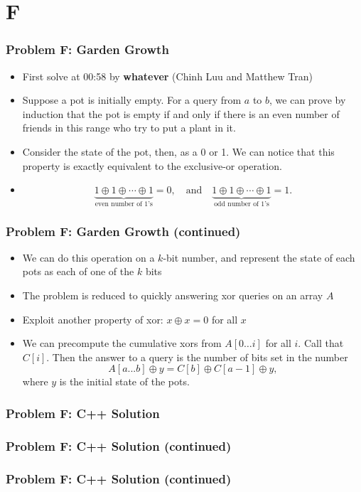 \section{F}%
\label{sec:f}

\begin{frame}
  \frametitle{Problem F: Garden Growth}

  \begin{itemize}
    \item First solve at 00:58 by \textbf{whatever} (Chinh Luu and Matthew Tran)
    \item Suppose a pot is initially empty. For a query from $a$ to $b$, we can prove by induction that the pot is empty if and only if there is
      an even number of friends in this range who try to put a plant in it.
    \item Consider the state of the pot, then, as a 0 or 1. We can notice that this property is exactly equivalent to the exclusive-or operation.
    \item \[ \underbrace{1 \oplus 1 \oplus \cdots \oplus 1}_{\text{even number of 1's}} = 0,\quad\text{and}\quad
      \underbrace{1 \oplus 1 \oplus \cdots \oplus 1}_{\text{odd number of 1's}} = 1. \]
  \end{itemize}

\end{frame}

\begin{frame}
  \frametitle{Problem F: Garden Growth (continued)}
  \begin{itemize}
      \item We can do this operation on a $k$-bit number, and represent the state of each pots as each of one of the $k$ bits
      \item The problem is reduced to quickly answering xor queries on an array $A$ 
      \item Exploit another property of xor: $x \oplus x = 0$ for all $x$
    \item We can precompute the cumulative xors
      from $A[0\dots i]$ for all $i$. Call that $C[i]$. Then the answer to a query is the number of bits set in the number \[ A[a...b] \oplus y = C[b] \oplus C[a-1] \oplus y, \]
      where $y$ is the initial state of the pots.
  \end{itemize}
\end{frame}

\begin{frame}
  \frametitle{Problem F: C++ Solution}
\end{frame}

\begin{frame}
  \frametitle{Problem F: C++ Solution (continued)}
\end{frame}

\begin{frame}
  \frametitle{Problem F: C++ Solution (continued)}
\end{frame}
